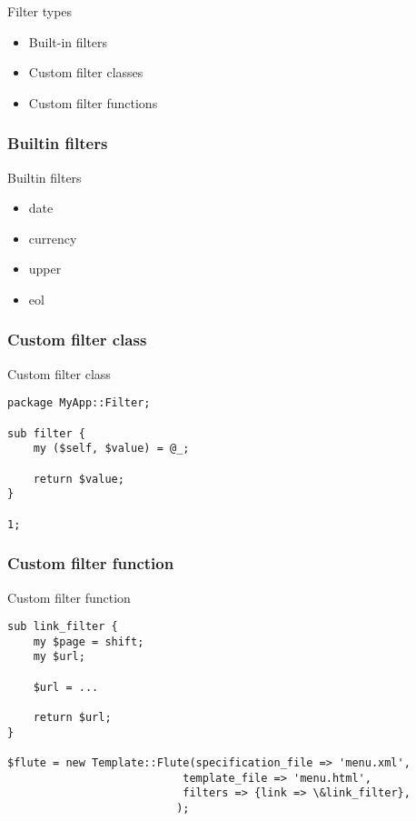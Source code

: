 \begin{frame}{Filter types}
\begin{itemize}
\item{Built-in filters}
\item{Custom filter classes}
\item{Custom filter functions}
\end{itemize}
\end{frame}

\subsubsection{Builtin filters}
\begin{frame}{Builtin filters}
\begin{itemize}
\item date
\item currency
\item upper
\item eol
\end{itemize}
\end{frame}

\subsubsection{Custom filter class}
\begin{frame}[fragile]{Custom filter class}
\begin{lstlisting}
package MyApp::Filter;

sub filter {
    my ($self, $value) = @_;

    return $value;
}

1;
\end{lstlisting}
\end{frame}

\subsubsection{Custom filter function}
\begin{frame}[fragile]{Custom filter function}
\begin{lstlisting}
sub link_filter {
    my $page = shift;
    my $url;

    $url = ...
    
    return $url;
}

$flute = new Template::Flute(specification_file => 'menu.xml',
						   template_file => 'menu.html',
						   filters => {link => \&link_filter},
						  );
\end{lstlisting}
\end{frame}

